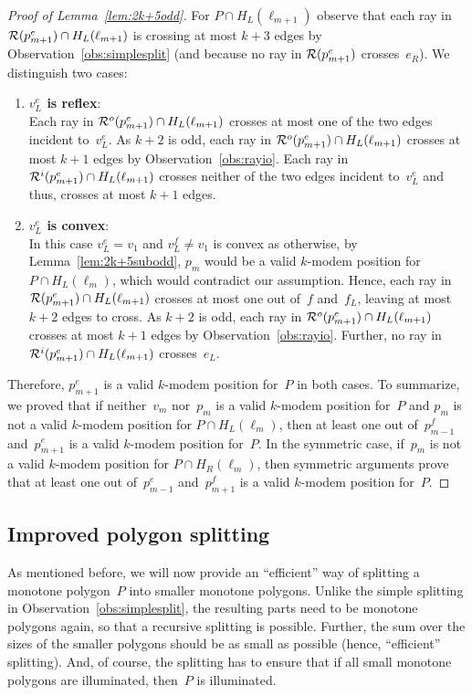 \documentclass[A4]{article}
\begin{document}
\begin{proof}[Proof of Lemma~\ref{lem:2k+5odd}]
For $P\cap H_L(\ell_{m+1})$ observe that each ray in ${\cal R}(p^e_{m+1})\cap H_L(\ell_{m+1})$ is crossing at most $k+3$ edges by Observation~\ref{obs:simplesplit} (and because no ray in ${\cal R}(p^e_{m+1})$ crosses~$e_R$).
We distinguish two cases:
\begin{enumerate}
\item \textbf{$v^e_L$ is reflex}:\\
Each ray in ${\cal R}^o(p^e_{m+1})\cap H_L(\ell_{m+1})$ crosses at most one of the two edges incident to~$v^e_L$.
As $k+2$ is odd, each ray in ${\cal R}^o(p^e_{m+1})\cap H_L(\ell_{m+1})$ crosses at most $k+1$ edges by Observation~\ref{obs:rayio}.
Each ray in ${\cal R}^i(p^e_{m+1})\cap H_L(\ell_{m+1})$ crosses neither of the two edges incident to~$v^e_L$ and thus, crosses at most $k+1$ edges.
\item \textbf{$v^e_L$ is convex}:\\
In this case $v^e_L=v_1$ and $v^f_L\neq v_1$ is convex as otherwise, by Lemma~\ref{lem:2k+5subodd}, $p_m$ would be a valid \mbox{$k$-modem} position for $P\cap H_L(\ell_{m})$, which would contradict our assumption.
Hence, each ray in ${\cal R}(p^e_{m+1})\cap H_L(\ell_{m+1})$ crosses at most one out of~$f$ and~$f_L$, leaving at most $k+2$ edges to cross.
As $k+2$ is odd, each ray in ${\cal R}^o(p^e_{m+1})\cap H_L(\ell_{m+1})$ crosses at most $k+1$ edges by Observation~\ref{obs:rayio}.
Further, no ray in ${\cal R}^i(p^e_{m+1})\cap H_L(\ell_{m+1})$ crosses~$e_L$.
\end{enumerate}
Therefore, $p^e_{m+1}$ is a valid \mbox{$k$-modem} position for~$P$ in both cases.
To summarize, we proved that if neither~$v_m$ nor~$p_m$ is a valid \mbox{$k$-modem} position for~$P$ and $p_m$ is not a valid \mbox{$k$-modem} position for $P\cap H_L(\ell_{m})$, then at least one out of~$p^f_{m-1}$ and~$p^e_{m+1}$ is a valid \mbox{$k$-modem} position for~$P$. 
In the symmetric case, if~$p_m$ is not a valid \mbox{$k$-modem} position for $P\cap H_R(\ell_{m})$, then symmetric arguments prove that at least one out of~$p^e_{m-1}$ and~$p^f_{m+1}$ is a valid \mbox{$k$-modem} position for~$P$.
\end{proof}



\subsection{Improved polygon splitting}
\label{sec:gmono-split}

As mentioned before, we will now provide an ``efficient'' way of splitting a monotone polygon~$P$ into smaller monotone polygons.
Unlike the simple splitting in Observation~\ref{obs:simplesplit}, the resulting parts need to be monotone polygons again, so that a recursive splitting is possible.
Further, the sum over the sizes of the smaller polygons should be as small as possible (hence, ``efficient'' splitting).
And, of course, the splitting has to ensure that if all small monotone polygons are illuminated, then~$P$ is illuminated.
\end{document}

